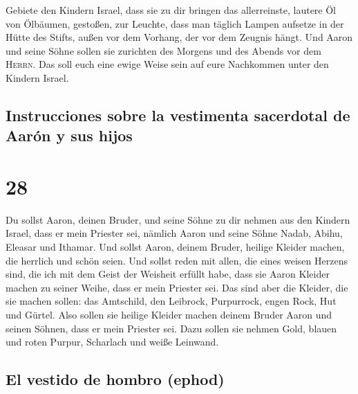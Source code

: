  Gebiete den Kindern Israel, dass sie zu dir bringen das
allerreinste, lautere Öl von Ölbäumen, gestoßen, zur Leuchte, dass man
täglich Lampen aufsetze  in der Hütte des Stifts, außen
vor dem Vorhang, der vor dem Zeugnis hängt. Und Aaron und seine Söhne
sollen sie zurichten des Morgens und des Abends vor dem \textsc{Herrn}.
Das soll euch eine ewige Weise sein auf eure Nachkommen unter den
Kindern Israel.

\hypertarget{instrucciones-sobre-la-vestimenta-sacerdotal-de-aaruxf3n-y-sus-hijos}{%
\subsection{Instrucciones sobre la vestimenta sacerdotal de Aarón y sus
hijos}\label{instrucciones-sobre-la-vestimenta-sacerdotal-de-aaruxf3n-y-sus-hijos}}

\hypertarget{section-27}{%
\section{28}\label{section-27}}

 Du sollst Aaron, deinen Bruder, und seine Söhne zu dir
nehmen aus den Kindern Israel, dass er mein Priester sei, nämlich Aaron
und seine Söhne Nadab, Abihu, Eleasar und Ithamar.  Und
sollst Aaron, deinem Bruder, heilige Kleider machen, die herrlich und
schön seien.  Und sollst reden mit allen, die eines weisen
Herzens sind, die ich mit dem Geist der Weisheit erfüllt habe, dass sie
Aaron Kleider machen zu seiner Weihe, dass er mein Priester sei.
 Das sind aber die Kleider, die sie machen sollen: das
Amtschild, den Leibrock, Purpurrock, engen Rock, Hut und Gürtel. Also
sollen sie heilige Kleider machen deinem Bruder Aaron und seinen Söhnen,
dass er mein Priester sei.  Dazu sollen sie nehmen Gold,
blauen und roten Purpur, Scharlach und weiße Leinwand.

\hypertarget{el-vestido-de-hombro-ephod}{%
\subsection{El vestido de hombro
(ephod)}\label{el-vestido-de-hombro-ephod}}

